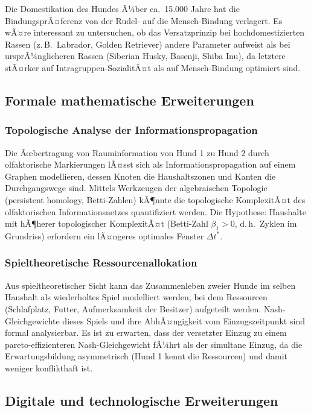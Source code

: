 ﻿\documentclass[12pt, a4paper]{article}
\theoremstyle{plain}
\theoremstyle{definition}
\theoremstyle{remark}
\newcommand{\dt}{\Delta t}
\begin{document}
Die Domestikation des Hundes Ã¼ber ca.\ 15.000 Jahre \cite{vonholdt2010genome}
hat die BindungsprÃ¤ferenz von der Rudel- auf die Mensch-Bindung verlagert.
Es wÃ¤re interessant zu untersuchen, ob das Versatzprinzip bei hochdomestizierten
Rassen (z.\,B.\ Labrador, Golden Retriever) andere Parameter aufweist als
bei ursprÃ¼nglicheren Rassen (Siberian Husky, Basenji, Shiba Inu), da
letztere stÃ¤rker auf Intragruppen-SozialitÃ¤t als auf Mensch-Bindung
optimiert sind.

\subsection{Formale mathematische Erweiterungen}

\subsubsection{Topologische Analyse der Informationspropagation}

Die Ãœbertragung von Rauminformation von Hund 1 zu Hund 2 durch olfaktorische
Markierungen lÃ¤sst sich als Informationspropagation auf einem Graphen
modellieren, dessen Knoten die Haushaltszonen und Kanten die Durchgangswege
sind. Mittels Werkzeugen der algebraischen Topologie (persistent homology,
Betti-Zahlen) kÃ¶nnte die topologische KomplexitÃ¤t des olfaktorischen
Informationsnetzes quantifiziert werden. Die Hypothese: Haushalte mit
hÃ¶herer topologischer KomplexitÃ¤t (Betti-Zahl $\beta_1 > 0$, d.\,h.\ Zyklen
im Grundriss) erfordern ein lÃ¤ngeres optimales Fenster $\dt^*$.

\subsubsection{Spieltheoretische Ressourcenallokation}

Aus spieltheoretischer Sicht kann das Zusammenleben zweier Hunde im selben
Haushalt als wiederholtes Spiel modelliert werden, bei dem Ressourcen
(Schlafplatz, Futter, Aufmerksamkeit der Besitzer) aufgeteilt werden.
Nash-Gleichgewichte dieses Spiels und ihre AbhÃ¤ngigkeit vom Einzugszeitpunkt
sind formal analysierbar. Es ist zu erwarten, dass der versetzter Einzug
zu einem pareto-effizienteren Nash-Gleichgewicht fÃ¼hrt als der simultane
Einzug, da die Erwartungsbildung asymmetrisch (Hund 1 kennt die Ressourcen)
und damit weniger konflikthaft ist.

\subsection{Digitale und technologische Erweiterungen}
\end{document}
